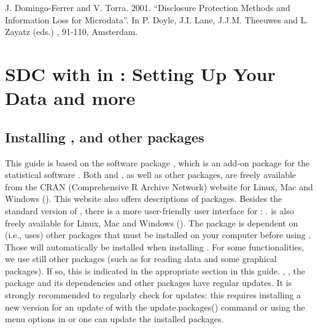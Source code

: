 \documentclass[letterpaper,10pt,english]{sphinxmanual}
\begin{document}
J. Domingo-Ferrer and V. Torra. 2001. “Disclosure Protection Methods and
Information Loss for Microdata”. In P. Doyle, J.I. Lane, J.J.M. Theeuwes
and L. Zayatz (eds.) , 91-110, Amsterdam.


\chapter{SDC with  in : Setting Up Your Data and more}
\label{\detokenize{sdcMicro:sdc-with-sdcmicro-in-r-setting-up-your-data-and-more}}\label{\detokenize{sdcMicro::doc}}

\section{Installing ,  and other packages}
\label{\detokenize{sdcMicro:installing-r-sdcmicro-and-other-packages}}
This guide is based on the software package , which is an
add-on package for the statistical software . Both  and
, as well as other  packages, are freely available from the
CRAN (Comprehensive R Archive Network) website for Linux, Mac and
Windows (). This website also offers
descriptions of packages. Besides the standard version of , there is
a more user-friendly user interface for : .  is
also freely available for Linux, Mac and Windows
(). The  package is dependent on (i.e.,
uses) other  packages that must be installed on your computer before
using . Those will automatically be installed when installing
. For some functionalities, we use still other packages (such
as  for reading data and some graphical packages). If so, this
is indicated in the appropriate section in this guide. , ,
the  package and its dependencies and other packages have
regular updates. It is strongly recommended to regularly check for
updates: this requires installing a new version for an update of 
with the update.packages() command or using the menu options in  or
 one can update the installed packages.
\end{document}
